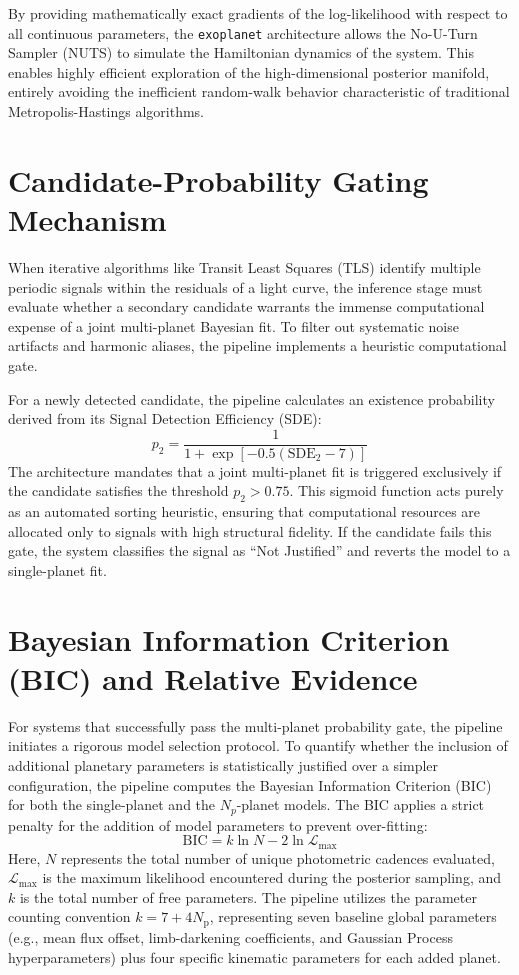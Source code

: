 \documentclass[12pt,a4paper,oneside]{report}
\newcommand{\code}[1]{\texttt{\small #1}}
\begin{document}
By providing mathematically exact gradients of the log-likelihood with respect to all continuous parameters, the \code{exoplanet} architecture allows the No-U-Turn Sampler (NUTS) to simulate the Hamiltonian dynamics of the system. This enables highly efficient exploration of the high-dimensional posterior manifold, entirely avoiding the inefficient random-walk behavior characteristic of traditional Metropolis-Hastings algorithms.

\section{Candidate-Probability Gating Mechanism}
When iterative algorithms like Transit Least Squares (TLS) identify multiple periodic signals within the residuals of a light curve, the inference stage must evaluate whether a secondary candidate warrants the immense computational expense of a joint multi-planet Bayesian fit. To filter out systematic noise artifacts and harmonic aliases, the pipeline implements a heuristic computational gate.

For a newly detected candidate, the pipeline calculates an existence probability derived from its Signal Detection Efficiency (SDE):
\begin{equation}
  p_2 = \frac{1}{1 + \exp[-0.5(\mathrm{SDE}_2 - 7)]}
\end{equation}
The architecture mandates that a joint multi-planet fit is triggered exclusively if the candidate satisfies the threshold $p_2 > 0.75$. This sigmoid function acts purely as an automated sorting heuristic, ensuring that computational resources are allocated only to signals with high structural fidelity. If the candidate fails this gate, the system classifies the signal as ``Not Justified'' and reverts the model to a single-planet fit.

\section{Bayesian Information Criterion (BIC) and Relative Evidence}
For systems that successfully pass the multi-planet probability gate, the pipeline initiates a rigorous model selection protocol. To quantify whether the inclusion of additional planetary parameters is statistically justified over a simpler configuration, the pipeline computes the Bayesian Information Criterion (BIC) for both the single-planet and the $N_p$-planet models. The BIC applies a strict penalty for the addition of model parameters to prevent over-fitting:
\begin{equation}
  \mathrm{BIC} = k\ln N - 2\ln\mathcal{L}_{\max}
\end{equation}
Here, $N$ represents the total number of unique photometric cadences evaluated, $\mathcal{L}_{\max}$ is the maximum likelihood encountered during the posterior sampling, and $k$ is the total number of free parameters. The pipeline utilizes the parameter counting convention $k = 7 + 4N_{\mathrm{p}}$, representing seven baseline global parameters (e.g., mean flux offset, limb-darkening coefficients, and Gaussian Process hyperparameters) plus four specific kinematic parameters for each added planet.
\end{document}
